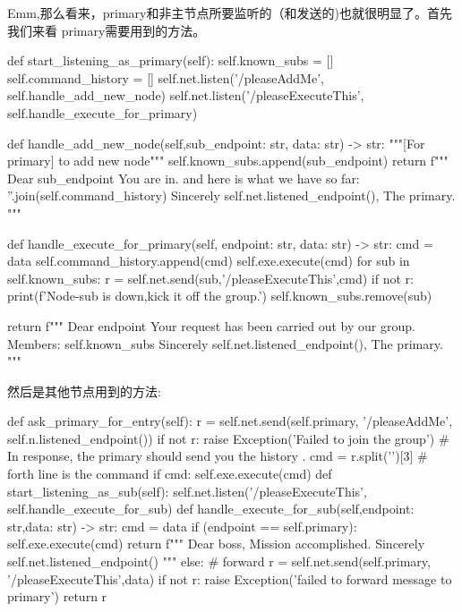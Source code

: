 \documentclass[dvipsnames]{ctexart}
\begin{document}
Emm,那么看来，primary和非主节点所要监听的（和发送的)也就很明显了。首先我们来看
primary需要用到的方法。
\begin{simplepy}
    def start_listening_as_primary(self):
        self.known_subs = []
        self.command_history = []
        self.net.listen('/pleaseAddMe',
                        self.handle_add_new_node)
        self.net.listen('/pleaseExecuteThis',
                        self.handle_execute_for_primary)

    def handle_add_new_node(self,sub_endpoint: str,
                            data: str) -> str:
        """[For primary] to add new node"""
        self.known_subs.append(sub_endpoint)
        return f"""
        Dear {sub_endpoint}
            You are in. and here is what we have so far:
            {''.join(self.command_history)}
                   Sincerely
                   {self.net.listened_endpoint()}, The primary.
        """

    def handle_execute_for_primary(self, endpoint: str,
                                   data: str) -> str:
        cmd = data
        self.command_history.append(cmd)
        self.exe.execute(cmd)
        for sub in self.known_subs:
            r = self.net.send(sub,'/pleaseExecuteThis',cmd)
            if not r:
                print(f'Node-{sub} is down,kick it off the group.')
                self.known_subs.remove(sub)

        return f"""
        Dear {endpoint}
             Your request has been carried out by our group.
             Members: {self.known_subs}
                 Sincerely
                 {self.net.listened_endpoint()}, The primary.
        """
\end{simplepy}
然后是其他节点用到的方法:
\begin{simplepy}
    def ask_primary_for_entry(self):
        r = self.net.send(self.primary,
                    '/pleaseAddMe',
                    self.n.listened_endpoint())
        if not r:
            raise Exception('Failed to join the group')
        # In response, the primary should send you the history .
        cmd = r.split('\n')[3]  # forth line is the command
        if cmd:
            self.exe.execute(cmd)
    def start_listening_as_sub(self):
        self.net.listen('/pleaseExecuteThis',
                        self.handle_execute_for_sub)
    def handle_execute_for_sub(self,endpoint: str,data: str) -> str:
        cmd = data
        if (endpoint == self.primary):
            self.exe.execute(cmd)
            return f"""
            Dear boss,
                 Mission accomplished.
                     Sincerely
                     {self.net.listened_endpoint()}
            """
        else:
            # forward
            r = self.net.send(self.primary,
                                 '/pleaseExecuteThis',data)
            if not r:
                raise Exception('failed to forward message to primary')
            return r
\end{simplepy}
\end{document}
